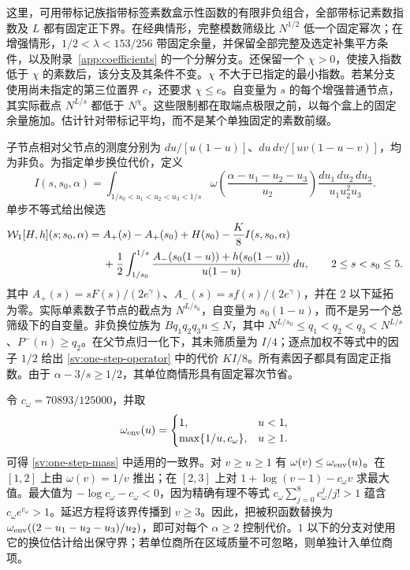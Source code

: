 这里，可用带标记族指带标签素数盒示性函数的有限非负组合，全部带标记素数指数及 $L$ 都有固定正下界。在经典情形，完整模数筛级比 $N^{1/2}$ 低一个固定幂次；在增强情形，$1/2<\lambda<153/256$ 带固定余量，并保留全部完整及选定补集平方条件，以及附录~\ref{app:coefficients} 的一个分解分支。还保留一个 $\chi>0$，使接入指数低于 $\chi$ 的素数后，该分支及其条件不变。$\chi$ 不大于已指定的最小指数。若某分支使用尚未指定的第三位置界 $c$，还要求 $\chi\le c$。自变量为 $s$ 的每个增强普通节点，其实际截点 $N^{L/s}$ 都低于 $N^\chi$。这些限制都在取端点极限之前，以每个盒上的固定余量施加。估计针对带标记平均，而不是某个单独固定的素数前缀。

子节点相对父节点的测度分别为 $du/[u(1-u)]$、$du\,dv/[uv(1-u-v)]$，均为非负。为指定单步换位代价，定义
\begin{equation}\label{sv:one-step-mass}
 I(s,s_0,\alpha)=
 \int_{1/s_0<u_1<u_2<u_3<1/s}
 \omega\!\left(\frac{\alpha-u_1-u_2-u_3}{u_2}\right)
                    \frac{du_1\,du_2\,du_3}{u_1u_2^2u_3}.
\end{equation}
单步不等式给出候选
\begin{align}\label{sv:one-step-operator}
 \mathcal W_1[H,h](s;s_0,\alpha)
 ={}&A_+(s)-A_+(s_0)+H(s_0)-\frac K8 I(s,s_0,\alpha)\notag\\
 &+\frac12\int_{1/s_0}^{1/s}
 \frac{A_-(s_0(1-u))+h(s_0(1-u))}{u(1-u)}\,du,
 \qquad 2\le s<s_0\le5.
\end{align}
其中 $A_+(s)=sF(s)/(2e^\gamma)$、$A_-(s)=sf(s)/(2e^\gamma)$，并在 $2$ 以下延拓为零。实际单素数子节点的截点为 $N^{L/s_0}$，自变量为 $s_0(1-u)$，而不是另一个总筛级下的自变量。非负换位族为 $Bq_1q_2q_3n\le N$，其中 $N^{L/s_0}\le q_1<q_2<q_3<N^{L/s}$、$P^-(n)\ge q_2$。在父节点归一化下，其未筛质量为 $I/4$；逐点加权不等式中的因子 $1/2$ 给出 \eqref{sv:one-step-operator} 中的代价 $KI/8$。所有素因子都具有固定正指数。由于 $\alpha-3/s\ge1/2$，其单位商情形具有固定幂次节省。

令 $c_\omega=70893/125000$，并取
\begin{equation}\label{sv:omega-envelope}
 \omega_{\rm env}(u)=
 \begin{cases}
 1,&u<1,\\
 \max\{1/u,c_\omega\},&u\ge1.
 \end{cases}
\end{equation}
可得 \eqref{sv:one-step-mass} 中适用的一致界。对 $v\ge u\ge1$ 有 $\omega(v)\le\omega_{\rm env}(u)$。在 $[1,2]$ 上由 $\omega(v)=1/v$ 推出；在 $[2,3]$ 上对 $1+\log(v-1)-c_\omega v$ 求最大值。最大值为 $-\log c_\omega-c_\omega<0$，因为精确有理不等式 $c_\omega\sum_{j=0}^8c_\omega^j/j!>1$ 蕴含 $c_\omega e^{c_\omega}>1$。延迟方程将该界传播到 $v\ge3$。因此，把被积函数替换为 $\omega_{\rm env}((2-u_1-u_2-u_3)/u_2)$，即可对每个 $\alpha\ge2$ 控制代价。$1$ 以下的分支对使用它的换位估计给出保守界；若单位商所在区域质量不可忽略，则单独计入单位商项。

